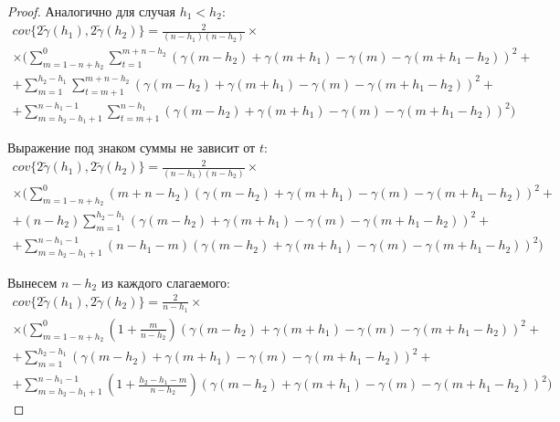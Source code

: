 \begin{proof}
Аналогично для случая $h_1 < h_2$:
\begin{multline*}
	cov\{ 2 \tilde{\gamma}(h_1), 2 \tilde{\gamma}(h_2) \} = \frac{2}{(n - h_1) (n - h_2)} \times \\
	\times (\sum_{m = 1 - n + h_2}^{0}\sum_{t = 1}^{m + n - h_2}(\gamma(m - h_2) + \gamma(m + h_1) - \gamma(m) - \gamma(m + h_1 - h_2))^2 + \\
	+ \sum_{m = 1}^{h_2 - h_1}\sum_{t = m + 1}^{m + n - h_2}(\gamma(m - h_2) + \gamma(m + h_1) - \gamma(m) - \gamma(m + h_1 - h_2))^2 + \\
	+ \sum_{m = h_2 - h_1 + 1}^{n - h_1 - 1}\sum_{t = m + 1}^{n - h_1}(\gamma(m - h_2) + \gamma(m + h_1) - \gamma(m) - \gamma(m + h_1 - h_2))^2)
\end{multline*}

Выражение под знаком суммы не зависит от $t$:
\begin{multline*}
	cov\{ 2 \tilde{\gamma}(h_1), 2 \tilde{\gamma}(h_2) \} = \frac{2}{(n - h_1) (n - h_2)} \times \\
	\times (\sum_{m = 1 - n + h_2}^{0}(m + n - h_2)(\gamma(m - h_2) + \gamma(m + h_1) - \gamma(m) - \gamma(m + h_1 - h_2))^2 + \\
	+ (n - h_2)\sum_{m = 1}^{h_2 - h_1}(\gamma(m - h_2) + \gamma(m + h_1) - \gamma(m) - \gamma(m + h_1 - h_2))^2 + \\
	+ \sum_{m = h_2 - h_1 + 1}^{n - h_1 - 1}(n - h_1 - m)(\gamma(m - h_2) + \gamma(m + h_1) - \gamma(m) - \gamma(m + h_1 - h_2))^2)
\end{multline*}

Вынесем $ n - h_2 $ из каждого слагаемого:
\begin{multline*}
	cov\{ 2 \tilde{\gamma}(h_1), 2 \tilde{\gamma}(h_2) \} = \frac{2}{n - h_1} \times \\
	\times (\sum_{m = 1 - n + h_2}^{0} (1 + \frac{m}{n - h_2})(\gamma(m - h_2) + \gamma(m + h_1) - \gamma(m) - \gamma(m + h_1 - h_2))^2 + \\
	+ \sum_{m = 1}^{h_2 - h_1}(\gamma(m - h_2) + \gamma(m + h_1) - \gamma(m) - \gamma(m + h_1 - h_2))^2 + \\
	+ \sum_{m = h_2 - h_1 + 1}^{n - h_1 - 1}(1 + \frac{h_2 - h_1 - m}{n - h_2})(\gamma(m - h_2) + \gamma(m + h_1) - \gamma(m) - \gamma(m + h_1 - h_2))^2)
\end{multline*}


\end{proof}
